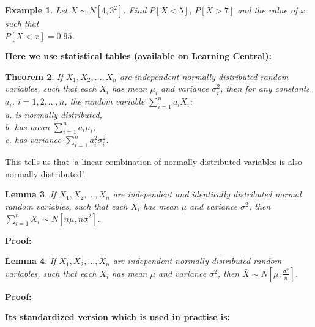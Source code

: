 \documentclass[12pt]{article}
\theoremstyle{break}
\newtheorem{theorem}{Theorem}[section]
\newtheorem{lemma}[theorem]{Lemma}
\newtheorem{example}[theorem]{Example}
\begin{document}
\begin{example}
Let $X \sim N[4,3^2]$. Find $P[X<5]$, $P[X>7]$ and the value of $x$ such that\\ $P[X<x]=0.95$.
\end{example}
\begin{mdframed}
{\bf Here we use statistical tables (available on Learning Central):}
\textcolor[rgb]{1.00,1.00,1.00}{\lipsum[1-2]}
\end{mdframed}
\begin{theorem}
If $X_{1},X_{2},\ldots,X_{n}$ are independent normally distributed random variables, such that each $X_{i}$ has mean $\mu_{i}$ and variance $\sigma_{i}^{2}$, then for any constants $a_{i}$, $i=1,2,\ldots,n$, the random variable $\displaystyle \sum_{i=1}^{n}a_{i}X_{i}$:\\
a. is normally distributed,\\
b. has mean $\displaystyle \sum_{i=1}^{n}a_{i}\mu_{i}$,\\
c. has variance $\displaystyle \sum_{i=1}^{n}a_{i}^{2}\sigma_{i}^{2}$.
\end{theorem}
This tells us that `a linear combination of normally distributed variables is also normally distributed'.

\begin{lemma}
If $X_{1},X_{2},\ldots,X_{n}$ are independent and identically distributed normal random variables, such that each $X_{i}$ has mean $\mu$ and variance $\sigma^{2}$, then $\displaystyle \sum_{i=1}^{n}X_{i} \sim N\left[n\mu, n\sigma^2\right]$.
\end{lemma}

\begin{mdframed}
{\bf Proof:}
\textcolor[rgb]{1.00,1.00,1.00}{\lipsum[1]}
\end{mdframed}

\begin{lemma}
If $X_{1},X_{2},\ldots,X_{n}$ are independent normally distributed random variables, such that each $X_{i}$ has mean $\mu$ and variance $\sigma^{2}$, then $\displaystyle \bar{X} \sim N\left[\mu, \frac{\sigma^{2}}{n}\right]$.
\end{lemma}

\begin{mdframed}
{\bf Proof:}
\textcolor[rgb]{1.00,1.00,1.00}{\lipsum[1]}
\end{mdframed}

\begin{mdframed}
{\bf Its standardized version which is used in practise is:}
\textcolor[rgb]{1.00,1.00,1.00}{\lipsum[1-2]}
\end{mdframed}
\end{document}
